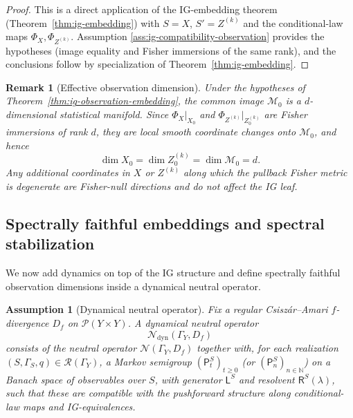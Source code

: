\documentclass[11pt]{article}
\newtheorem{assumption}{Assumption}
\newtheorem{remark}{Remark}
\newcommand{\Pcal}{\mathcal{P}}
\begin{document}
\begin{proof}
This is a direct application of the IG-embedding theorem
(Theorem~\ref{thm:ig-embedding}) with $S=X$, $S'=Z^{(k)}$ and the
conditional-law maps $\Phi_X,\Phi_{Z^{(k)}}$. Assumption
\ref{ass:ig-compatibility-observation} provides the hypotheses (image
equality and Fisher immersions of the same rank), and the conclusions
follow by specialization of Theorem~\ref{thm:ig-embedding}.
\end{proof}

\begin{remark}[Effective observation dimension]
\label{rem:effective-observation-dimension}
Under the hypotheses of Theorem~\ref{thm:ig-observation-embedding},
the common image $\mathcal M_0$ is a $d$-dimensional statistical
manifold. Since $\Phi_X|_{X_0}$ and $\Phi_{Z^{(k)}}|_{Z^{(k)}_0}$ are
Fisher immersions of rank $d$, they are local smooth coordinate changes onto
$\mathcal M_0$, and hence
\[
  \dim X_0 = \dim Z^{(k)}_0 = \dim \mathcal M_0 = d.
\]
Any additional coordinates in $X$ or $Z^{(k)}$ along which the pullback
Fisher metric is degenerate are Fisher-null directions and do not affect
the IG leaf.
\end{remark}

\subsection{Spectrally faithful embeddings and spectral stabilization}
\label{subsec:spectral-faithfulness}

We now add dynamics on top of the IG structure and define spectrally
faithful observation dimensions inside a dynamical neutral operator.

\begin{assumption}[Dynamical neutral operator]
\label{ass:dynamical-neutral-operator}
Fix a regular Csiszár--Amari $f$-divergence $D_f$ on $\Pcal(Y\times Y)$.
A \emph{dynamical neutral operator}
\[
  \mathcal N_{\mathrm{dyn}}(\Gamma_Y,D_f)
\]
consists of the neutral operator
$\mathcal N(\Gamma_Y,D_f)$ together with, for each realization
$(S,\Gamma_S,q)\in\mathcal R(\Gamma_Y)$, a Markov semigroup
$(\mathsf P^S_t)_{t\ge 0}$ (or $(\mathsf P^S_n)_{n\in\mathbb N}$) on a
Banach space of observables over $S$, with generator $\mathsf L^S$ and
resolvent $\mathsf R^S(\lambda)$, such that these are compatible with
the pushforward structure along conditional-law maps and IG-equivalences.
\end{assumption}
\end{document}
